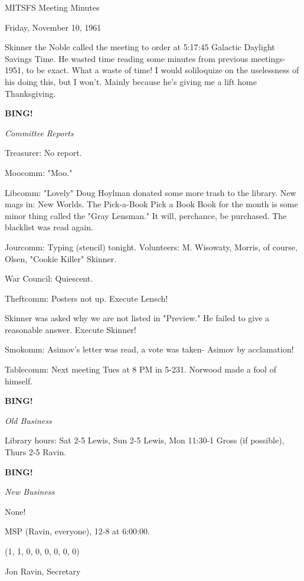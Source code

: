 \documentclass[12pt]{article}
\newcommand{\bing}{{\bf BING!} }
\newcommand{\goto}[1]{\bing \vskip 12pt \centerline{{\em{#1}}}}
\begin{document}
\begin{center}

MITSFS Meeting Minutes

Friday, November 10, 1961

\end{center}
 
\vspace{12pt}

\setlength{\parskip}{6pt}

\noindent
Skinner the Noble called the meeting to order at 5:17:45 Galactic Daylight Savings Time. He wasted time reading some minutes from previous meetings- 1951, to be exact. What a waste of time! I would soliloquize on the uselessness of his doing this, but I won't. Mainly because he's giving me a lift home Thanksgiving.

\goto{Committee Reports}

Treasurer: No report.

Moocomm: "Moo."

Libcomm: "Lovely" Doug Hoylman donated some more trash to the library. New mags in: New Worlds. The Pick-a-Book Pick a Book Book for the month is some minor thing called the "Gray Lensman." It will, perchance, be purchased. The blacklist was read again.

Jourcomm: Typing (stencil) tonight. Volunteers: M. Wisowaty, Morris, of course, Olsen, "Cookie Killer" Skinner.

War Council: Quiescent.

Theftcomm: Posters not up. Execute Lensch!

Skinner was asked why we are not listed in "Preview." He failed to give a reasonable answer. Execute Skinner!

Smokomm: Asimov's letter was read, a vote was taken- Asimov by acclamation!

Tablecomm: Next meeting Tues at 8 PM in 5-231. Norwood made a fool of himself.

\goto{Old Business}

Library hours: Sat 2-5 Lewis, Sun 2-5 Lewis, Mon 11:30-1 Gross (if possible), Thurs 2-5 Ravin.

\goto{New Business}

None!

MSP (Ravin, everyone), 12-8 at 6:00:00.

(1, 1, 0, 0, 0, 0, 0, 0)

\vspace{12pt}

\centerline{Jon Ravin, Secretary}
\end{document}
